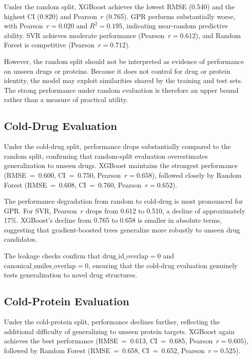 \documentclass[10pt,conference]{IEEEtran}
\begin{document}
Under the random split, XGBoost achieves the lowest RMSE (0.540) and the highest CI (0.820) and Pearson~$r$ (0.765). GPR performs substantially worse, with Pearson~$r = 0.020$ and $R^2 = 0.195$, indicating near-random predictive ability. SVR achieves moderate performance (Pearson~$r = 0.612$), and Random Forest is competitive (Pearson~$r = 0.712$).

However, the random split should not be interpreted as evidence of performance on unseen drugs or proteins. Because it does not control for drug or protein identity, the model may exploit similarities shared by the training and test sets. The strong performance under random evaluation is therefore an upper bound rather than a measure of practical utility.

\subsection{Cold-Drug Evaluation}
\label{subsec:cold_drug}

Under the cold-drug split, performance drops substantially compared to the random split, confirming that random-split evaluation overestimates generalization to unseen drugs. XGBoost maintains the strongest performance (RMSE~=~0.600, CI~=~0.750, Pearson~$r = 0.658$), followed closely by Random Forest (RMSE~=~0.608, CI~=~0.760, Pearson~$r = 0.652$).

The performance degradation from random to cold-drug is most pronounced for GPR. For SVR, Pearson~$r$ drops from 0.612 to 0.510, a decline of approximately 17\%. XGBoost's decline from 0.765 to 0.658 is smaller in absolute terms, suggesting that gradient-boosted trees generalize more robustly to unseen drug candidates.

The leakage checks confirm that $\text{drug\_id\_overlap} = 0$ and $\text{canonical\_smiles\_overlap} = 0$, ensuring that the cold-drug evaluation genuinely tests generalization to novel drug structures.

\subsection{Cold-Protein Evaluation}
\label{subsec:cold_protein}

Under the cold-protein split, performance declines further, reflecting the additional difficulty of generalizing to unseen protein targets. XGBoost again achieves the best performance (RMSE~=~0.613, CI~=~0.685, Pearson~$r = 0.605$), followed by Random Forest (RMSE~=~0.658, CI~=~0.652, Pearson~$r = 0.525$).
\end{document}
